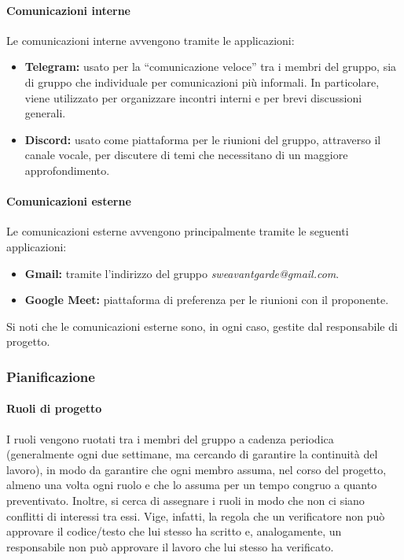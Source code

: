 \paragraph{Comunicazioni interne}
Le comunicazioni interne avvengono tramite le applicazioni:
\begin{itemize}
    \item \textbf{Telegram:} usato per la ``comunicazione veloce'' tra i membri del gruppo, sia di gruppo che individuale per comunicazioni più informali. In particolare, viene utilizzato per organizzare incontri interni e per brevi discussioni generali.
    \item \textbf{Discord:} usato come piattaforma per le riunioni del gruppo, attraverso il canale vocale, per discutere di temi che necessitano di un maggiore approfondimento.
\end{itemize}

\paragraph{Comunicazioni esterne}
Le comunicazioni esterne avvengono principalmente tramite le seguenti applicazioni:
\begin{itemize}
    \item \textbf{Gmail:} tramite l’indirizzo del gruppo \textit{sweavantgarde@gmail.com}.
    \item \textbf{Google Meet:} piattaforma di preferenza per le riunioni con il proponente.
\end{itemize}
Si noti che le comunicazioni esterne sono, in ogni caso, gestite dal responsabile di progetto. 

\subsubsection{Pianificazione}
\paragraph{Ruoli di progetto}
I ruoli vengono ruotati tra i membri del gruppo a cadenza periodica (generalmente ogni due settimane, ma cercando di garantire la continuità del lavoro), in modo da garantire che ogni membro assuma, nel corso del progetto, almeno una volta ogni ruolo e che lo assuma per un tempo congruo a quanto preventivato. 
Inoltre, si cerca di assegnare i ruoli in modo che non ci siano conflitti di interessi tra essi. Vige, infatti, la regola che un verificatore non può approvare il codice/testo che lui stesso ha scritto e, analogamente, un responsabile non può approvare il lavoro che lui stesso ha verificato. \\

